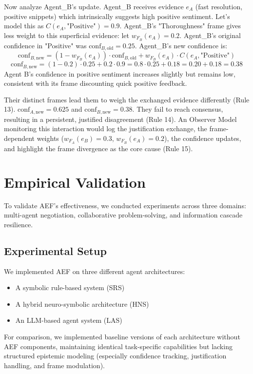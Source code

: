 \documentclass[10pt,a4paper]{article}
\begin{document}
Now analyze Agent\_B's update. Agent\_B receives evidence $e_A$ (fast resolution, positive snippets) which intrinsically suggests high positive sentiment. Let's model this as $C(e_A, \text{"Positive"}) = 0.9$. Agent\_B's "Thoroughness" frame gives less weight to this superficial evidence: let $w_{F_B}(e_A) = 0.2$.
Agent\_B's original confidence in "Positive" was $\mathrm{conf}_{B,\mathrm{old}} = 0.25$.
Agent\_B's new confidence is:
$$ \mathrm{conf}_{B,\mathrm{new}} = (1 - w_{F_B}(e_A)) \cdot \mathrm{conf}_{B,\mathrm{old}} + w_{F_B}(e_A) \cdot C(e_A, \text{"Positive"}) $$
$$ \mathrm{conf}_{B,\mathrm{new}} = (1 - 0.2) \cdot 0.25 + 0.2 \cdot 0.9 = 0.8 \cdot 0.25 + 0.18 = 0.20 + 0.18 = 0.38 $$
Agent B's confidence in positive sentiment increases slightly but remains low, consistent with its frame discounting quick positive feedback.

Their distinct frames lead them to weigh the exchanged evidence differently (Rule 13). $\mathrm{conf}_{A,\mathrm{new}} = 0.625$ and $\mathrm{conf}_{B,\mathrm{new}} = 0.38$. They fail to reach consensus, resulting in a persistent, justified disagreement (Rule 14). An Observer Model monitoring this interaction would log the justification exchange, the frame-dependent weights ($w_{F_A}(e_B)=0.3$, $w_{F_B}(e_A)=0.2$), the confidence updates, and highlight the frame divergence as the core cause (Rule 15).


\section{Empirical Validation}
To validate AEF's effectiveness, we conducted experiments across three domains: multi-agent negotiation, collaborative problem-solving, and information cascade resilience.

\subsection{Experimental Setup}
We implemented AEF on three different agent architectures:
\begin{itemize}
\item A symbolic rule-based system (SRS)
\item A hybrid neuro-symbolic architecture (HNS)
\item An LLM-based agent system (LAS)
\end{itemize}

For comparison, we implemented baseline versions of each architecture without AEF components, maintaining identical task-specific capabilities but lacking structured epistemic modeling (especially confidence tracking, justification handling, and frame modulation).
\end{document}
